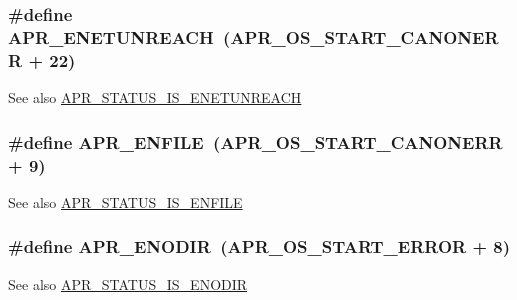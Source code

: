 \subsubsection[{\texorpdfstring{A\+P\+R\+\_\+\+E\+N\+E\+T\+U\+N\+R\+E\+A\+CH}{APR_ENETUNREACH}}]{\setlength{\rightskip}{0pt plus 5cm}\#define A\+P\+R\+\_\+\+E\+N\+E\+T\+U\+N\+R\+E\+A\+CH~({\bf A\+P\+R\+\_\+\+O\+S\+\_\+\+S\+T\+A\+R\+T\+\_\+\+C\+A\+N\+O\+N\+E\+RR} + 22)}\hypertarget{group___a_p_r___error_gab9b7124a88817d1b69cdef059f7dc689}{}\label{group___a_p_r___error_gab9b7124a88817d1b69cdef059f7dc689}
\begin{DoxySeeAlso}{See also}
\hyperlink{group___a_p_r___s_t_a_t_u_s___i_s_ga51a7c94e6a19b41cff77b0acd7c4f879}{A\+P\+R\+\_\+\+S\+T\+A\+T\+U\+S\+\_\+\+I\+S\+\_\+\+E\+N\+E\+T\+U\+N\+R\+E\+A\+CH} 
\end{DoxySeeAlso}
\subsubsection[{\texorpdfstring{A\+P\+R\+\_\+\+E\+N\+F\+I\+LE}{APR_ENFILE}}]{\setlength{\rightskip}{0pt plus 5cm}\#define A\+P\+R\+\_\+\+E\+N\+F\+I\+LE~({\bf A\+P\+R\+\_\+\+O\+S\+\_\+\+S\+T\+A\+R\+T\+\_\+\+C\+A\+N\+O\+N\+E\+RR} + 9)}\hypertarget{group___a_p_r___error_gaf46f59147b00c2c87d76b9eb75674456}{}\label{group___a_p_r___error_gaf46f59147b00c2c87d76b9eb75674456}
\begin{DoxySeeAlso}{See also}
\hyperlink{group___a_p_r___s_t_a_t_u_s___i_s_ga014bd8d59b8aa867284de8222b996440}{A\+P\+R\+\_\+\+S\+T\+A\+T\+U\+S\+\_\+\+I\+S\+\_\+\+E\+N\+F\+I\+LE} 
\end{DoxySeeAlso}
\subsubsection[{\texorpdfstring{A\+P\+R\+\_\+\+E\+N\+O\+D\+IR}{APR_ENODIR}}]{\setlength{\rightskip}{0pt plus 5cm}\#define A\+P\+R\+\_\+\+E\+N\+O\+D\+IR~({\bf A\+P\+R\+\_\+\+O\+S\+\_\+\+S\+T\+A\+R\+T\+\_\+\+E\+R\+R\+OR} + 8)}\hypertarget{group___a_p_r___error_ga9a8077e85b6241c1e91b69548395fc09}{}\label{group___a_p_r___error_ga9a8077e85b6241c1e91b69548395fc09}
\begin{DoxySeeAlso}{See also}
\hyperlink{group___a_p_r___s_t_a_t_u_s___i_s_ga419375c28976aa16d728515788a16659}{A\+P\+R\+\_\+\+S\+T\+A\+T\+U\+S\+\_\+\+I\+S\+\_\+\+E\+N\+O\+D\+IR} 
\end{DoxySeeAlso}
